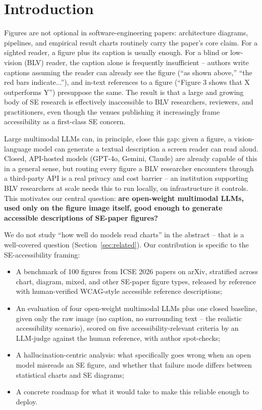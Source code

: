 \documentclass[10pt,conference]{IEEEtran}
\begin{document}
\section{Introduction}

Figures are not optional in software-engineering papers: architecture diagrams, pipelines, and empirical result charts routinely carry the paper's core claim. For a sighted reader, a figure plus its caption is usually enough. For a blind or low-vision (BLV) reader, the caption alone is frequently insufficient -- authors write captions assuming the reader can already see the figure (``as shown above,'' ``the red bars indicate...''), and in-text references to a figure (``Figure 3 shows that X outperforms Y'') presuppose the same. The result is that a large and growing body of SE research is effectively inaccessible to BLV researchers, reviewers, and practitioners, even though the venues publishing it increasingly frame accessibility as a first-class SE concern.

Large multimodal LLMs can, in principle, close this gap: given a figure, a vision-language model can generate a textual description a screen reader can read aloud. Closed, API-hosted models (GPT-4o, Gemini, Claude) are already capable of this in a general sense, but routing every figure a BLV researcher encounters through a third-party API is a real privacy and cost barrier -- an institution supporting BLV researchers at scale needs this to run locally, on infrastructure it controls. This motivates our central question: \textbf{are open-weight multimodal LLMs, used only on the figure image itself, good enough to generate accessible descriptions of SE-paper figures?}

We do not study ``how well do models read charts'' in the abstract -- that is a well-covered question (Section~\ref{sec:related}). Our contribution is specific to the SE-accessibility framing:
\begin{itemize}
\item A benchmark of 100 figures from ICSE 2026 papers on arXiv, stratified across chart, diagram, mixed, and other SE-paper figure types, released by reference with human-verified WCAG-style accessible reference descriptions;
\item An evaluation of four open-weight multimodal LLMs plus one closed baseline, given only the raw image (no caption, no surrounding text -- the realistic accessibility scenario), scored on five accessibility-relevant criteria by an LLM-judge against the human reference, with author spot-checks;
\item A hallucination-centric analysis: what specifically goes wrong when an open model misreads an SE figure, and whether that failure mode differs between statistical charts and SE diagrams;
\item A concrete roadmap for what it would take to make this reliable enough to deploy.
\end{itemize}
\end{document}
